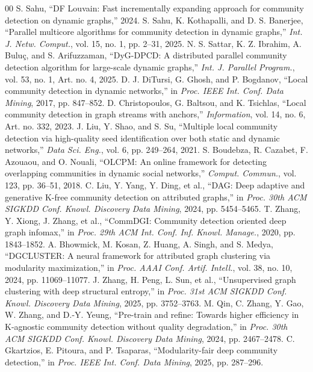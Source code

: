 \documentclass[conference]{IEEEtran}
\theoremstyle{definition}
\begin{document}
\begin{thebibliography}{00}
    S. Sahu, ``DF Louvain: Fast incrementally expanding approach for community detection on dynamic graphs,'' 2024.
    S. Sahu, K. Kothapalli, and D. S. Banerjee, ``Parallel multicore algorithms for community detection in dynamic graphs,'' \textit{Int. J. Netw. Comput.}, vol. 15, no. 1, pp. 2--31, 2025.
    N. S. Sattar, K. Z. Ibrahim, A. Bulu{\c c}, and S. Arifuzzaman, ``DyG-DPCD: A distributed parallel community detection algorithm for large-scale dynamic graphs,'' \textit{Int. J. Parallel Program.}, vol. 53, no. 1, Art. no. 4, 2025.
    D. J. DiTursi, G. Ghosh, and P. Bogdanov, ``Local community detection in dynamic networks,'' in \textit{Proc. IEEE Int. Conf. Data Mining}, 2017, pp. 847--852.
    D. Christopoulos, G. Baltsou, and K. Tsichlas, ``Local community detection in graph streams with anchors,'' \textit{Information}, vol. 14, no. 6, Art. no. 332, 2023.
    J. Liu, Y. Shao, and S. Su, ``Multiple local community detection via high-quality seed identification over both static and dynamic networks,'' \textit{Data Sci. Eng.}, vol. 6, pp. 249--264, 2021.
    S. Boudebza, R. Cazabet, F. Azouaou, and O. Nouali, ``OLCPM: An online framework for detecting overlapping communities in dynamic social networks,'' \textit{Comput. Commun.}, vol. 123, pp. 36--51, 2018.
    C. Liu, Y. Yang, Y. Ding, et al., ``DAG: Deep adaptive and generative K-free community detection on attributed graphs,'' in \textit{Proc. 30th ACM SIGKDD Conf. Knowl. Discovery Data Mining}, 2024, pp. 5454--5465.
    T. Zhang, Y. Xiong, J. Zhang, et al., ``CommDGI: Community detection oriented deep graph infomax,'' in \textit{Proc. 29th ACM Int. Conf. Inf. Knowl. Manage.}, 2020, pp. 1843--1852.
    A. Bhowmick, M. Kosan, Z. Huang, A. Singh, and S. Medya, ``DGCLUSTER: A neural framework for attributed graph clustering via modularity maximization,'' in \textit{Proc. AAAI Conf. Artif. Intell.}, vol. 38, no. 10, 2024, pp. 11069--11077.
    J. Zhang, H. Peng, L. Sun, et al., ``Unsupervised graph clustering with deep structural entropy,'' in \textit{Proc. 31st ACM SIGKDD Conf. Knowl. Discovery Data Mining}, 2025, pp. 3752--3763.
    M. Qin, C. Zhang, Y. Gao, W. Zhang, and D.-Y. Yeung, ``Pre-train and refine: Towards higher efficiency in K-agnostic community detection without quality degradation,'' in \textit{Proc. 30th ACM SIGKDD Conf. Knowl. Discovery Data Mining}, 2024, pp. 2467--2478.
    C. Gkartzios, E. Pitoura, and P. Tsaparas, ``Modularity-fair deep community detection,'' in \textit{Proc. IEEE Int. Conf. Data Mining}, 2025, pp. 287--296.
\end{thebibliography}
\endgroup
\end{document}
